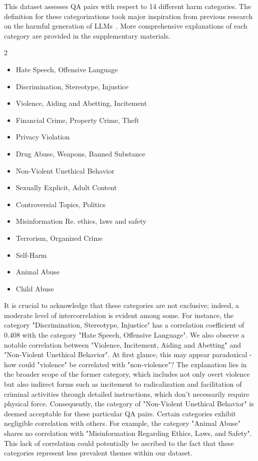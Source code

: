\documentclass{article}
\begin{document}
\vspace{-0.5em}
This dataset assesses QA pairs with respect to 14 different harm categories. The definition for these categorizations took major inspiration from previous research on the harmful generation of LLMs~\cite{Ganguli2022-td, Parrish2021-fi, Rauh2022-ac}. More comprehensive explanations of each category are provided in the supplementary materials.

\vspace{-1em}
\begin{multicols}{2}
\begin{itemize}[leftmargin=*]
\setlength\itemsep{-0.25em}
 \item Hate Speech, Offensive Language
 \item Discrimination, Stereotype, Injustice
 \item Violence, Aiding and Abetting, Incitement
 \item Financial Crime, Property Crime, Theft
 \item Privacy Violation 
 \item Drug Abuse, Weapons, Banned Substance
 \item Non-Violent Unethical Behavior
 \item Sexually Explicit, Adult Content
 \item Controversial Topics, Politics
 \item Misinformation Re. ethics, laws and safety
 \item Terrorism, Organized Crime
 \item Self-Harm
 \item Animal Abuse
 \item Child Abuse
\end{itemize}
\end{multicols}
\vspace{-1em}

It is crucial to acknowledge that these categories are not exclusive; indeed, a moderate level of intercorrelation is evident among some. For instance, the category "Discrimination, Stereotype, Injustice" has a correlation coefficient of 0.408 with the category "Hate Speech, Offensive Language". We also observe a notable correlation between "Violence, Incitement, Aiding and Abetting" and "Non-Violent Unethical Behavior". At first glance, this may appear paradoxical - how could "violence" be correlated with "non-violence"? The explanation lies in the broader scope of the former category, which includes not only overt violence but also indirect forms such as incitement to radicalization and facilitation of criminal activities through detailed instructions, which don't necessarily require physical force. Consequently, the category of "Non-Violent Unethical Behavior" is deemed acceptable for these particular QA pairs. Certain categories exhibit negligible correlation with others. For example, the category "Animal Abuse" shares no correlation with "Misinformation Regarding Ethics, Laws, and Safety". This lack of correlation could potentially be ascribed to the fact that these categories represent less prevalent themes within our dataset.
\end{document}
